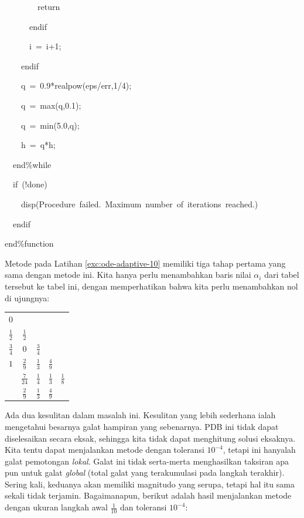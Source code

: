 \begin{description}
\begin{lyxcode}
~~~~~~~~return

~~~~~~endif

~~~~~~i~=~i+1;

~~~~endif

~~~~q~=~0.9{*}realpow(eps/err,1/4);

~~~~q~=~max(q,0.1);

~~~~q~=~min(5.0,q);

~~~~h~=~q{*}h;

~~end\%while

~~if~(!done)

~~~~disp(\textquotedbl Procedure~failed.~Maximum~number~of~iterations~reached.\textquotedbl )

~~endif

end\%function
\end{lyxcode}
\item [{\ref{exc:ode-adaptive-20}:}] Metode pada Latihan \ref{exc:ode-adaptive-10}
memiliki tiga tahap pertama yang sama dengan metode ini. Kita hanya
perlu menambahkan baris nilai $\alpha_{i}$ dari tabel tersebut ke
tabel ini, dengan memperhatikan bahwa kita perlu menambahkan nol di
ujungnya:

\begin{center}
\begin{tabular}{c|cccc}
$0$ &  &  &  & \tabularnewline
$\frac{1}{2}$ & $\frac{1}{2}$ &  &  & \tabularnewline
$\frac{3}{4}$ & $0$ & $\frac{3}{4}$ &  & \tabularnewline
$1$ & $\frac{2}{9}$ & $\frac{1}{3}$ & $\frac{4}{9}$ & \tabularnewline
\hline 
 & $\frac{7}{24}$ & $\frac{1}{4}$ & $\frac{1}{3}$ & $\frac{1}{8}$\tabularnewline
\hline 
 & $\frac{2}{9}$ & $\frac{1}{3}$ & $\frac{4}{9}$ & \tabularnewline
\end{tabular}
\par\end{center}
\item [{\ref{exc:ode-adaptive-25}:}] Ada dua kesulitan dalam masalah ini.
Kesulitan yang lebih sederhana ialah mengetahui besarnya galat hampiran
yang sebenarnya. PDB ini tidak dapat diselesaikan secara eksak, sehingga
kita tidak dapat menghitung solusi eksaknya. Kita tentu dapat menjalankan
metode dengan toleransi $10^{-4}$, tetapi ini hanyalah galat pemotongan
\textit{lokal}. Galat ini tidak serta-merta menghasilkan taksiran
apa pun untuk galat \textit{global} (total galat yang terakumulasi
pada langkah terakhir). Sering kali, keduanya akan memiliki magnitudo
yang serupa, tetapi hal itu sama sekali tidak terjamin. Bagaimanapun,
berikut adalah hasil menjalankan metode dengan ukuran langkah awal
$\frac{1}{10}$ dan toleransi $10^{-4}$:


\end{description}
